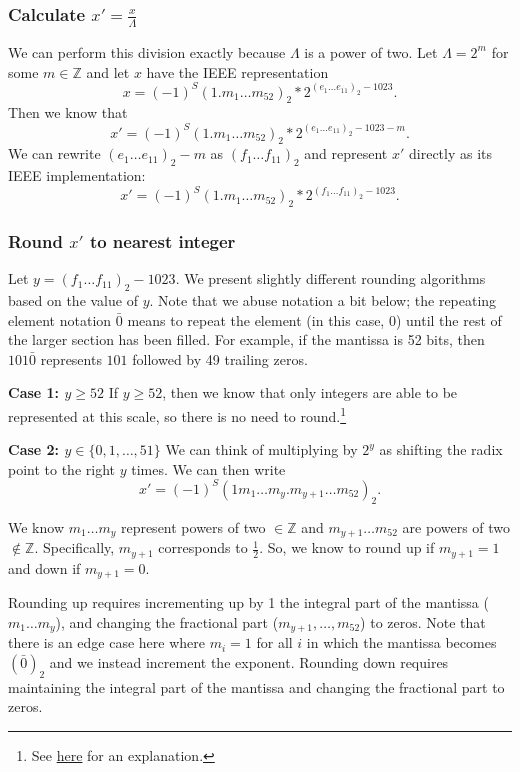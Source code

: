 \documentclass[11pt]{scrartcl} %
\begin{document}
\subsubsection{Calculate $x' = \frac{x}{\Lambda}$}
We can perform this division exactly because $\Lambda$ is a power of two. Let $\Lambda = 2^m$ for some $m \in \mathbb{Z}$ and let $x$ have the IEEE representation
\[ x = (-1)^S (1.m_{1} \hdots m_{52})_2 * 2^{(e_1 \hdots e_{11})_2-1023}. \]
Then we know that
\[ x' = (-1)^S (1.m_{1} \hdots m_{52})_2 * 2^{(e_1 \hdots e_{11})_2-1023-m}. \]
We can rewrite $(e_1 \hdots e_{11})_2 - m$ as $(f_1 \hdots f_{11})_2$ and represent $x'$ directly as its IEEE implementation:
\[ x' = (-1)^S (1.m_{1} \hdots m_{52})_2 * 2^{(f_1 \hdots f_{11})_2-1023}. \]

\subsubsection{Round $x'$ to nearest integer}
Let $y = (f_1 \hdots f_{11})_2-1023$. We present slightly different rounding algorithms based on the value of $y$. Note that we abuse notation a bit below; the repeating element notation $\bar{0}$ means to repeat the element (in this case, 0) until the rest of the larger section has been filled. For example, if the mantissa is 52 bits, then $101\bar{0}$ represents $101$ followed by 49 trailing zeros. \newline

\textbf{Case 1: $y \geq 52$} \newline
If $y \geq 52$, then we know that only integers are able to be represented at this scale, so there is no need to round.\footnote{See \href{https://www.exploringbinary.com/the-spacing-of-binary-floating-point-numbers/}{here} for an explanation.} \newline

\textbf{Case 2: $y \in \{0, 1, \hdots, 51\}$} \newline
We can think of multiplying by $2^y$ as shifting the radix point to the right $y$ times. We can then write
\[ x' = (-1)^S (1m_1 \hdots m_y.m_{y+1} \hdots m_{52})_2. \]

We know $m_1 \hdots m_y$ represent powers of two $\in \mathbb{Z}$ and $m_{y+1} \hdots m_{52}$ are powers of two $\not \in \mathbb{Z}$. Specifically, $m_{y+1}$ corresponds to $\frac{1}{2}$. So, we know to round up if $m_{y+1} = 1$ and down if $m_{y+1} = 0$. \newline

Rounding up requires incrementing up by 1 the integral part of the mantissa ($m_1 \hdots m_y$), and changing the fractional part ($m_{y+1}, \hdots, m_{52}$) to zeros. Note that there is an edge case here where $m_i = 1$ for all $i$ in which the mantissa becomes $(\bar{0})_2$ and we instead increment the exponent. Rounding down requires maintaining the integral part of the mantissa and changing the fractional part to zeros. \newline
\end{document}

